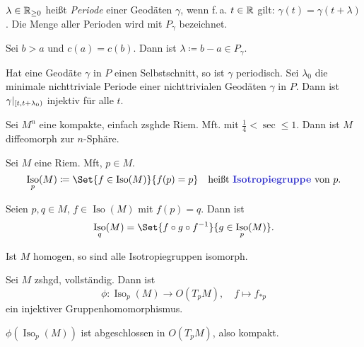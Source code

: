 \documentclass{cheat-sheet}
\DeclareMathOperator{\Iso}{Iso} %
\begin{document}
\begin{defn}
  $\lambda \in \mathbb{R}_{\geq 0}$ heißt \emph{Periode} einer Geodäten $\gamma$, wenn f.\,a. $t \in \mathbb{R}$ gilt: $\gamma(t) = \gamma(t + \lambda)$. Die Menge aller Perioden wird mit $P_\gamma$ bezeichnet.
\end{defn}


\begin{lem}
  Sei $b > a$ und $c(a) = c(b)$. Dann ist $\lambda \coloneqq b - a \in P_\gamma$.
\end{lem}

\begin{kor}
  Hat eine Geodäte $\gamma$ in $P$ einen Selbstschnitt, so ist $\gamma$ periodisch. Sei $\lambda_0$ die minimale nichttriviale Periode einer nichttrivialen Geodäten $\gamma$ in $P$. Dann ist $\gamma|_{\left[ t, t+\lambda_0 \right)}$ injektiv für alle $t$.
\end{kor}


\begin{satz}
  Sei $M^n$ eine kompakte, einfach zsghde Riem. Mft. mit $\tfrac{1}{4} < \sec \leq 1$. Dann ist $M$ diffeomorph zur $n$-Sphäre.
\end{satz}

\begin{defn}
  Sei $M$ eine Riem. Mft, $p \in M$.
  \[
    \Iso_p(M) \coloneqq \Set{ f \in \Iso(M) }{ f(p) = p } \quad
    \text{heißt \emph{Isotropiegruppe} von $p$.}
  \]
\end{defn}

\begin{lem}
  Seien $p, q \in M$, $f \in \Iso(M)$ mit $f(p) = q$. Dann ist
  \[ \Iso_q(M) = \Set{ f \circ g \circ f^{-1} }{ g \in \Iso_p(M) }. \]
\end{lem}

\begin{kor}
  Ist $M$ homogen, so sind alle Isotropiegruppen isomorph.
\end{kor}

\begin{bem}
  Sei $M$ zshgd, vollständig. Dann ist
  \[
    \phi : \Iso_p(M) \to O(T_p M), \quad
    f \mapsto f_{*p}
  \]
  ein injektiver Gruppenhomomorphismus.
\end{bem}

\begin{satz}
  $\phi(\Iso_p(M))$ ist abgeschlossen in $O(T_p M)$, also kompakt.
\end{satz}
\end{document}
